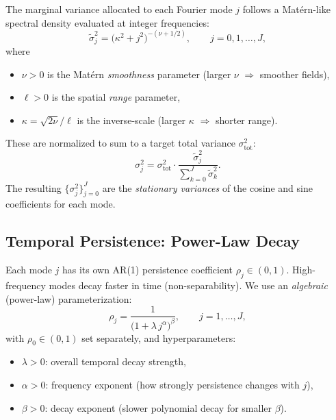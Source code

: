\documentclass[12pt]{article}
\begin{document}
The marginal variance allocated to each Fourier mode $j$ follows a Mat\'{e}rn-like spectral
density evaluated at integer frequencies:
\begin{equation}
  \tilde{\sigma}_j^2 = \bigl(\kappa^2 + j^2\bigr)^{-(\nu + 1/2)}, \qquad j = 0,1,\ldots,J,
  \label{eq:raw-spec}
\end{equation}
where
\begin{itemize}[noitemsep]
  \item $\nu > 0$ is the Mat\'{e}rn \emph{smoothness} parameter (larger $\nu$ $\Rightarrow$ smoother fields),
  \item $\ell > 0$ is the spatial \emph{range} parameter,
  \item $\kappa = \sqrt{2\nu}/\ell$ is the inverse-scale (larger $\kappa$ $\Rightarrow$ shorter range).
\end{itemize}

These are normalized to sum to a target total variance $\sigma^2_\mathrm{tot}$:
\begin{equation}
  \sigma_j^2 = \sigma^2_\mathrm{tot} \cdot \frac{\tilde{\sigma}_j^2}{\displaystyle\sum_{k=0}^{J} \tilde{\sigma}_k^2}.
  \label{eq:sigma-norm}
\end{equation}
The resulting $\{\sigma_j^2\}_{j=0}^J$ are the \emph{stationary variances} of the cosine and sine
coefficients for each mode.

\subsection{Temporal Persistence: Power-Law Decay}

Each mode $j$ has its own AR(1) persistence coefficient $\rho_j \in (0,1)$. High-frequency modes
decay faster in time (non-separability). We use an \emph{algebraic} (power-law) parameterization:
\begin{equation}
  \rho_j = \frac{1}{\bigl(1 + \lambda\, j^\alpha\bigr)^\beta}, \qquad j = 1,\ldots,J,
  \label{eq:rhoj}
\end{equation}
with $\rho_0 \in (0,1)$ set separately, and hyperparameters:
\begin{itemize}[noitemsep]
  \item $\lambda > 0$: overall temporal decay strength,
  \item $\alpha > 0$: frequency exponent (how strongly persistence changes with $j$),
  \item $\beta > 0$: decay exponent (slower polynomial decay for smaller $\beta$).
\end{itemize}
\end{document}
